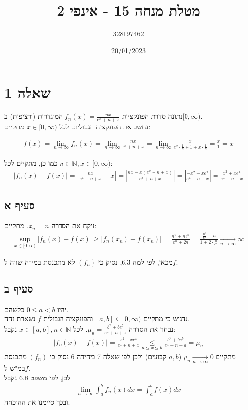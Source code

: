 \documentclass{article}
\title{מטלת מנחה 15 - אינפי 2}
\author{328197462}
\date{20/01/2023}
\newcommand\underrel[2]{\mathrel{\mathop{#2}\limits_{#1}}}
\begin{document}
\long{}
\maketitle

\section*{שאלה 1}

נתונה סדרת הפונקציות $f_n(x)=\frac{nx}{e^x+n+x}$ המוגדרות (ורציפות) ב$[0, \infty)$. \\
נחשב את הפונקציה הגבולית. לכל $x\in[0, \infty)$ מתקיים:

\begin{align*}
    f(x)=
    \lim_{n\rightarrow \infty} f_n(x)=
    \lim_{n\rightarrow \infty} \frac{nx}{e^x+n+x}=
    \lim_{n\rightarrow \infty} \frac{x}{e^x \cdot \frac{1}{n}+1+x\cdot \frac{1}{n}}=
    \frac{x}{1}=x
\end{align*}

כמו כן, מתקיים לכל $n\in \mathbb{N}, x\in[0, \infty)$:
\begin{align*}
    |f_n(x)-f(x)|=
    |\frac{nx}{e^x+n+x}-x|=
    |\frac{nx-x(e^x+n+x)}{e^x+n+x}|=
    |\frac{-x^2-xe^x}{e^x+n+x}|=
    \frac{x^2+xe^x}{e^x+n+x}
\end{align*}

\subsection*{סעיף א}

ניקח את הסדרה $x_n=n$. מתקיים:
\begin{align*}
    \sup_{x\in[0, \infty)} |f_n(x)-f(x)| \geq
    |f_n(x_n)-f(x_n)|=
    \frac{n^2+ne^n}{e^n+2n}=
    \frac{\frac{n^2}{e^n}+n}{1+2\cdot \frac{n}{e^n}}\xrightarrow[n\rightarrow \infty]{}
    \infty
\end{align*}

מכאן, לפי למה $6.3$, נסיק כי $(f_n)$ לא מתכנסת במידה שווה ל$f$.

\subsection*{סעיף ב}

יהיו $0\leq a < b$ כלשהם. \\
נדגיש כי מתקיים $[a,b]\subseteq [0,\infty)$ והפונקציה הגבולית $f$ נשארת זהה. \\
נבחר את הסדרה $\mu_n=\frac{b^2+be^b}{e^a+n+a}$. לכל $x\in [a,b], n\in\mathbb{N}$ נקבל:
\begin{align*}
    |f_n(x)-f(x)| =
    \frac{x^2+xe^x}{e^x+n+x} \underrel{a\leq x \leq b}{\leq}
    \frac{b^2+be^b}{e^a+n+a}=\mu_n
\end{align*}
מתקיים $\mu_n\xrightarrow[n\rightarrow\infty]{}0$ ($a,b$ קבועים) ולכן לפי שאלה 7 ביחידה 6 נסיק כי $(f_n)$ מתכנסת במ"ש ל$f$. \\
לכן, לפי משפט $6.8$ נקבל
\begin{align*}
    \lim_{n\rightarrow \infty} \int_a^bf_n(x)dx= \int_a^b f(x)dx
\end{align*}
ובכך סיימנו את ההוכחה.
\end{document}
